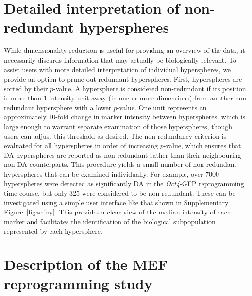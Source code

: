 \documentclass{article}
\begin{document}
\section{Detailed interpretation of non-redundant hyperspheres}
While dimensionality reduction is useful for providing an overview of the data, it necessarily discards information that may actually be biologically relevant.
To assist users with more detailed interpretation of individual hyperspheres, we provide an option to prune out redundant hyperspheres.
First, hyperspheres are sorted by their $p$-value.
A hypersphere is considered non-redundant if its position is more than 1 intensity unit away (in one or more dimensions) from another non-redundant hypersphere with a lower $p$-value.
One unit represents an approximately 10-fold change in marker intensity between hyperspheres, which is large enough to warrant separate examination of those hyperspheres, though users can adjust this threshold as desired.
The non-redundancy criterion is evaluated for all hyperspheres in order of increasing $p$-value, which ensures that DA hyperspheres are reported as non-redundant rather than their neighbouring non-DA counterparts.
This procedure yields a small number of non-redundant hyperspheres that can be examined individually.
For example, over 7000 hyperspheres were detected as significantly DA in the \textit{Oct4}-GFP reprogramming time course, but only 325 were considered to be non-redundant.
These can be investigated using a simple user interface like that shown in Supplementary Figure~\ref{fig:shiny}.
This provides a clear view of the median intensity of each marker and facilitates the identification of the biological subpopulation represented by each hypersphere.

\section{Description of the MEF reprogramming study}
\end{document}
